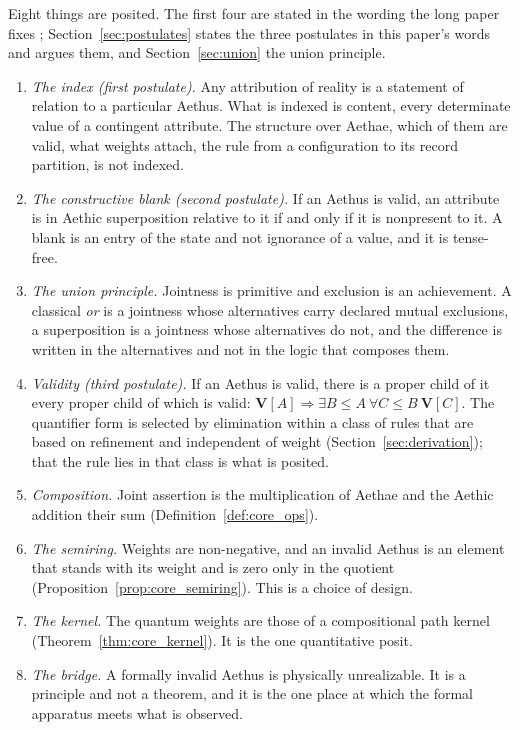 \documentclass[11pt]{article}
\theoremstyle{definition}
\newcommand{\Aethus}{Aethus}
\begin{document}
Eight things are posited. The first four are stated in the wording the long paper fixes \cite{Aethus}; Section~\ref{sec:postulates} states the three postulates in this paper's words and argues them, and Section~\ref{sec:union} the union principle.
\begin{enumerate}
\item[\textbf{1.}] \emph{The index (first postulate).} Any attribution of reality is a statement of relation to a particular \Aethus{}. What is indexed is content, every determinate value of a contingent attribute. The structure over Aethae, which of them are valid, what weights attach, the rule from a configuration to its record partition, is not indexed.
\item[\textbf{2.}] \emph{The constructive blank (second postulate).} If an \Aethus{} is valid, an attribute is in Aethic superposition relative to it if and only if it is nonpresent to it. A blank is an entry of the state and not ignorance of a value, and it is tense-free.
\item[\textbf{3.}] \emph{The union principle.} Jointness is primitive and exclusion is an achievement. A classical \emph{or} is a jointness whose alternatives carry declared mutual exclusions, a superposition is a jointness whose alternatives do not, and the difference is written in the alternatives and not in the logic that composes them.
\item[\textbf{4.}] \emph{Validity (third postulate).} If an \Aethus{} is valid, there is a proper child of it every proper child of which is valid: $\mathbf{V}[A] \Longrightarrow \exists B \le A\ \forall C \le B\ \mathbf{V}[C]$. The quantifier form is selected by elimination within a class of rules that are based on refinement and independent of weight (Section~\ref{sec:derivation}); that the rule lies in that class is what is posited.
\item[\textbf{5.}] \emph{Composition.} Joint assertion is the multiplication of Aethae and the Aethic addition their sum (Definition~\ref{def:core_ops}).
\item[\textbf{6.}] \emph{The semiring.} Weights are non-negative, and an invalid \Aethus{} is an element that stands with its weight and is zero only in the quotient (Proposition~\ref{prop:core_semiring}). This is a choice of design.
\item[\textbf{7.}] \emph{The kernel.} The quantum weights are those of a compositional path kernel (Theorem~\ref{thm:core_kernel}). It is the one quantitative posit.
\item[\textbf{8.}] \emph{The bridge.} A formally invalid \Aethus{} is physically unrealizable. It is a principle and not a theorem, and it is the one place at which the formal apparatus meets what is observed.
\end{enumerate}
\end{document}
